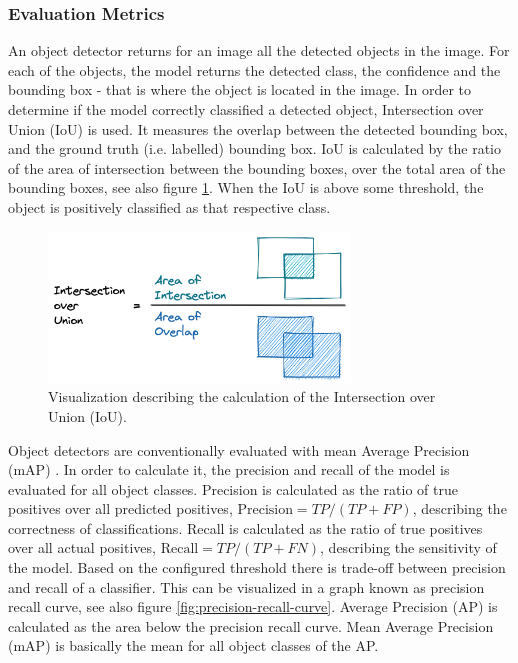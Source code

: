 \subsubsection{Evaluation Metrics}


An object detector returns for an image all the detected objects in the image. For each of the objects, the model returns the detected class, the confidence and the bounding box - that is where the object is located in the image. In order to determine if the model correctly classified a detected object, Intersection over Union (IoU) is used. It measures the overlap between the detected bounding box, and the ground truth (i.e. labelled) bounding box. IoU is calculated by the ratio of the area of intersection between the bounding boxes, over the total area of the bounding boxes, see also figure \ref{fig:iou}. When the IoU is above some threshold, the object is positively classified as that respective class.



\begin{figure}[ht]
\begin{center}
\includegraphics[height=4cm]{images/5_multimodal_fusion/IoU.png}
\end{center}
\captionsetup{width=0.95\textwidth}
\caption{Visualization describing the calculation of the Intersection over Union (IoU).}
\label{fig:iou}
\end{figure}



Object detectors are conventionally evaluated with mean Average Precision (mAP) \cite{Padilla2021}. In order to calculate it, the precision and recall of the model is evaluated for all object classes. Precision is calculated as the ratio of true positives over all predicted positives, $\text{Precision} = TP / (TP + FP)$, describing the correctness of classifications. Recall is calculated as the ratio of true positives over all actual positives, $\text{Recall} = TP / (TP + FN)$, describing the sensitivity of the model. Based on the configured threshold there is trade-off between precision and recall of a classifier. This can be visualized in a graph known as precision recall curve, see also figure \ref{fig:precision-recall-curve}. Average Precision (AP) is calculated as the area below the precision recall curve. Mean Average Precision (mAP) is basically the mean for all object classes of the AP.



